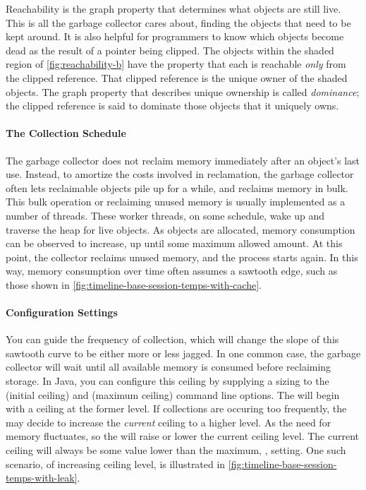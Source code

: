 Reachability is the graph property that determines what objects are still live.
This is all the garbage collector cares about, finding the objects that need to
be kept around. It is also helpful for programmers to know which objects become
dead as the result of a pointer being clipped. The objects within the shaded
region of \autoref{fig:reachability-b} have the property that each is reachable
\emph{only} from the clipped reference. That clipped reference is the unique
owner of the shaded objects. The graph property that describes unique ownership
is called \emph{dominance};  the clipped reference is said to
dominate those objects that it uniquely owns.

\paragraph{The Collection Schedule}
The garbage collector does not reclaim memory immediately after an object's last
use. Instead, to amortize the costs involved in reclamation, the garbage
collector often lets reclaimable objects pile up for a while, and reclaims memory
in bulk. This bulk operation or reclaiming unused memory is usually implemented
as a number of threads. These worker threads, on some schedule, wake up and
traverse the heap for live objects. As objects are allocated, memory consumption
can be observed to increase, up until some maximum allowed amount. At this point,
the collector reclaims unused memory, and the process starts again. In this way,
memory consumption over time often assumes a sawtooth edge, such as those shown
in \autoref{fig:timeline-base-session-temps-with-cache}.

\paragraph{Configuration Settings}
You can guide the frequency of collection, which will change the slope of this
sawtooth curve to be either more or less jagged. In one common case, the garbage
collector will wait until all available memory is consumed before reclaiming
storage.  In Java, you can configure this ceiling by supplying a sizing to the
 (initial ceiling) and
 (maximum ceiling) command line options. 
 The \jre will begin with a ceiling at the
former level. If collections are occuring too frequently, the \jre may decide to
increase the \emph{current} ceiling to a higher level. As the need for memory
fluctuates, so the \jre will raise or lower the current ceiling level. The
current ceiling will always be some value lower than the maximum, ,
setting. One such scenario, of increasing ceiling level, is illustrated in
\autoref{fig:timeline-base-session-temps-with-leak}.

